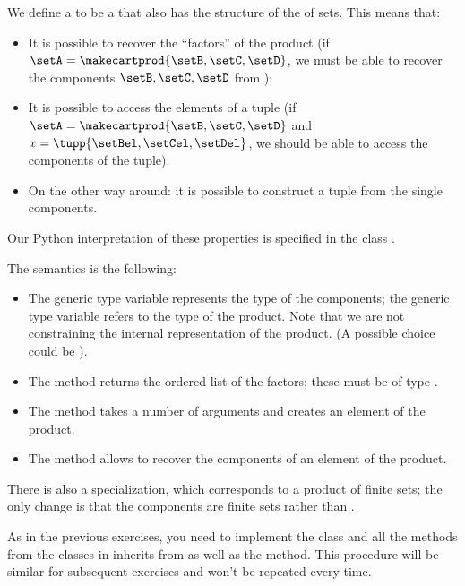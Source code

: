 
We define a  to be a \Setoid that also has the structure of the  of sets.
This means that:
\begin{itemize}
    \item It is possible to recover the ``factors'' of the product (if $\setA = \makecartprod{\setB, \setC, \setD}$, we must be able to recover the components $\setB, \setC, \setD$ from \setA);
    \item It is possible to access the elements of a tuple (if $\setA = \makecartprod{\setB, \setC, \setD}$ and $x = \tupp{\setBel, \setCel, \setDel}$, we should be able to access the components of the tuple).
    \item On the other way around: it is possible to construct a tuple from the single components.
\end{itemize}
Our Python interpretation of these properties is specified in the class .


The semantics is the following:
\begin{itemize}
    \item The generic type variable  represents the type of the components; the generic type variable 
          refers to the type of the product.
          Note that we are not constraining the internal representation of the product.
          (A possible choice could be ).
    \item The method  returns the ordered list of the  factors; these must be  of type .
    \item The method  takes a number of arguments and creates an element of the product.
    \item The method  allows to recover the components of an element of the product.
\end{itemize}

There is also a specialization, which corresponds to a product of finite sets; the only change is that the components are finite sets rather than .



As in the previous exercises, you need to implement the class  and all the methods from the classes in inherits from as well as the  method.
This procedure will be similar for subsequent exercises and won't be repeated every time.

